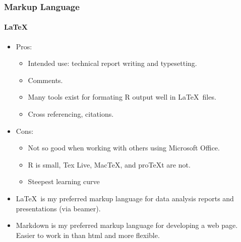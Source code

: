 \documentclass[t]{beamer}\usepackage[]{graphicx}\usepackage[]{color}
\begin{document}
\begin{frame}
  \frametitle{Markup Language}
  \framesubtitle{\LaTeX}
  \begin{itemize}
    \item Pros: 
      \begin{itemize}
        \item Intended use: technical report writing and typesetting.
        \item Comments.
        \item Many tools exist for formating R output well in \LaTeX\ files.
        \item Cross referencing, citations.
      \end{itemize}

    \item Cons:
      \begin{itemize}
        \item Not so good when working with others using Microsoft Office.
        \item R is small,  Tex Live, MacTeX, and proTeXt are not.
        \item Steepest learning curve
      \end{itemize}

    \item \LaTeX\ is my preferred markup language for data analysis reports and
      presentations (via beamer).

    \item Markdown is my preferred markup language for developing a web page.
      Easier to work in than html and more flexible.

  \end{itemize} 
\end{frame}

\end{document}
